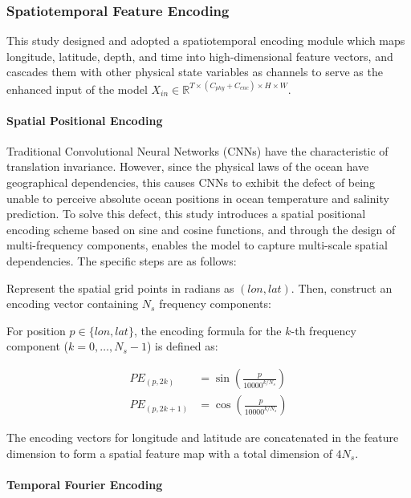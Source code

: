 \documentclass[webpdf,contemporary,large]{oup-authoring-template}
\begin{document}
\subsubsection{Spatiotemporal Feature Encoding}

This study designed and adopted a spatiotemporal encoding module which maps longitude, latitude, depth, and time into high-dimensional feature vectors, and cascades them with other physical state variables as channels to serve as the enhanced input of the model $X_{in} \in \mathbb{R}^{T \times (C_{phy} + C_{enc}) \times H \times W}$.

\paragraph{Spatial Positional Encoding}

Traditional Convolutional Neural Networks (CNNs) have the characteristic of translation invariance. However, since the physical laws of the ocean have geographical dependencies, this causes CNNs to exhibit the defect of being unable to perceive absolute ocean positions in ocean temperature and salinity prediction. To solve this defect, this study introduces a spatial positional encoding scheme based on sine and cosine functions, and through the design of multi-frequency components, enables the model to capture multi-scale spatial dependencies. The specific steps are as follows:

Represent the spatial grid points in radians as $(lon, lat)$. Then, construct an encoding vector containing $N_s$ frequency components:

For position $p \in \{lon,lat\}$, the encoding formula for the $k$-th frequency component ($k=0, \dots, N_s-1$) is defined as:

\begin{equation}
\begin{aligned}
PE_{(p, 2k)} &= \sin\left(\frac{p}{10000^{k/N_s}}\right) \\
PE_{(p, 2k+1)} &= \cos\left(\frac{p}{10000^{k/N_s}}\right)
\end{aligned}
\end{equation}

The encoding vectors for longitude and latitude are concatenated in the feature dimension to form a spatial feature map with a total dimension of $4N_s$.

\paragraph{Temporal Fourier Encoding}
\end{document}
